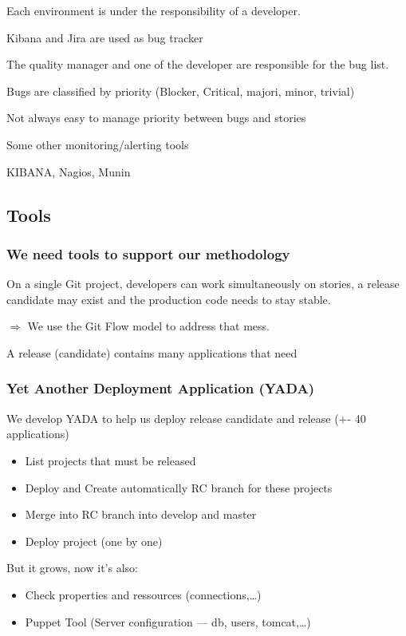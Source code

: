 \documentclass[a4paper, 11pt]{article}
\begin{document}
    Each environment is under the responsibility of a developer.

    Kibana and Jira are used as bug tracker

    The quality manager and one of the developer are responsible for the bug list.

    Bugs are classified by priority (Blocker, Critical, majori, minor, trivial)

    Not always easy to manage priority between bugs and stories

    Some other monitoring/alerting tools

    KIBANA, Nagios, Munin

    \subsection{Tools}

    \subsubsection{We need tools to support our methodology}

    On a single Git project, developers can work simultaneously on stories, a
    release candidate may exist and the production code needs to stay stable.

    $\Rightarrow$ We use the Git Flow model to address that mess.

    A release (candidate) contains many applications that need

    \subsubsection{Yet Another Deployment Application (YADA)}

    We develop YADA to help us deploy release candidate and release (+- 40 applications)

    \begin{itemize}
        \item List projects that must be released
        \item Deploy and Create automatically RC branch for these projects
        \item Merge into RC branch into develop and master
        \item Deploy project (one by one)
    \end{itemize}

    But it grows, now it's also:

    \begin{itemize}
        \item Check properties and ressources (connections,\ldots)
        \item Puppet Tool (Server configuration --- db, users, tomcat,\ldots)
    \end{itemize}
\end{document}
